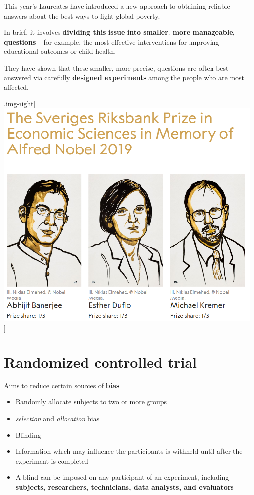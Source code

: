 \documentclass[]{article}
\providecommand{\tightlist}{%
  \setlength{\itemsep}{0pt}\setlength{\parskip}{0pt}}
\begin{document}
This year's Laureates have introduced a new approach to obtaining
reliable answers about the best ways to fight global poverty.

In brief, it involves \textbf{dividing this issue into smaller, more
manageable, questions} -- for example, the most effective interventions
for improving educational outcomes or child health.

They have shown that these smaller, more precise, questions are often
best answered via carefully \textbf{designed experiments} among the
people who are most affected.

.img-right{[} \includegraphics{../inst/images/Nobel2019.png}{]}

\hypertarget{randomized-controlled-trial-1}{%
\section{Randomized controlled
trial}\label{randomized-controlled-trial-1}}

Aims to reduce certain sources of \textbf{bias}

\begin{itemize}
\tightlist
\item
  Randomly allocate subjects to two or more groups
\item
  \emph{selection} and \emph{allocation} bias
\item
  Blinding
\item
  Information which may influence the participants is withheld until
  after the experiment is completed
\item
  A blind can be imposed on any participant of an experiment, including
  \textbf{subjects, researchers, technicians, data analysts, and
  evaluators}
\end{itemize}
\end{document}
